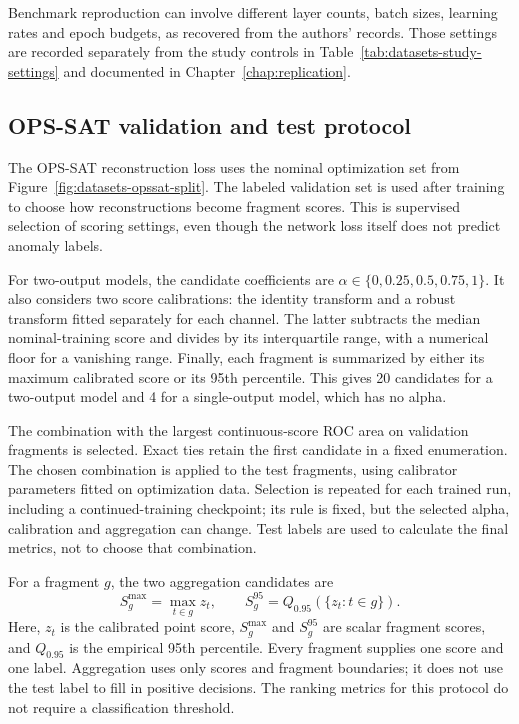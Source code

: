 Benchmark reproduction can involve different layer counts, batch sizes,
learning rates and epoch budgets, as recovered from the authors' records.
Those settings are recorded separately from the study controls in
Table~\ref{tab:datasets-study-settings} and documented in
Chapter~\ref{chap:replication}.

\subsection{OPS-SAT validation and test protocol}
\label{sec:datasets-opssat-protocol}
The \ac{OPS-SAT} reconstruction loss uses the nominal optimization set from
Figure~\ref{fig:datasets-opssat-split}. The labeled validation set is used
after training to choose how reconstructions become fragment scores. This
is supervised selection of scoring settings, even though the network loss
itself does not predict anomaly labels.

For two-output models, the candidate coefficients are
\(\alpha\in\{0,0.25,0.5,0.75,1\}\). It also considers two score calibrations:
the identity transform and a robust transform fitted separately for each
channel. The latter subtracts the median nominal-training score and divides
by its interquartile range, with a numerical floor for a vanishing range.
Finally, each fragment is summarized by either its maximum calibrated score
or its \num{95}th percentile. This gives \num{20} candidates for a
two-output model and \num{4} for a single-output model, which has no alpha.

The combination with the largest continuous-score \ac{ROC} area on
validation fragments is selected. Exact ties retain the first candidate
in a fixed enumeration. The chosen combination is applied to the test
fragments, using calibrator parameters fitted on optimization data.
Selection is repeated for each trained run, including a continued-training
checkpoint; its rule is fixed, but the selected alpha, calibration and
aggregation can change. Test labels are used to calculate the final metrics,
not to choose that combination.

For a fragment \(g\), the two aggregation candidates are
\begin{equation}
  S_g^{\max}=\max_{t\in g} z_t,
  \qquad
  S_g^{95}=Q_{0.95}\!\left(\{z_t:t\in g\}\right).
  \label{eq:datasets-fragment-score}
\end{equation}
Here, \(z_t\) is the calibrated point score, \(S_g^{\max}\) and \(S_g^{95}\)
are scalar fragment scores, and \(Q_{0.95}\) is the empirical \num{95}th
percentile. Every fragment supplies one score and one label. Aggregation
uses only scores and fragment boundaries; it does not use the test label
to fill in positive decisions. The ranking metrics for this protocol do
not require a classification threshold.

